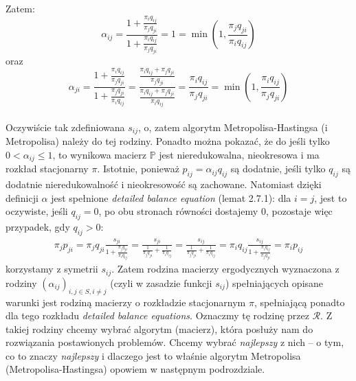 \documentclass[a4paper]{article}
\begin{document}
Zatem:
$$\alpha_{ij} = \frac{1 + \frac{\pi_i q_{ij}}{\pi_j q_{ji}}}{1 + \frac{\pi_i q_{ij}}{\pi_j q_{ji}}} = 1 = \min(1, \frac{\pi_j q_{ji}}{\pi_i q_{ij}})$$
oraz
$$\alpha_{ji} = \frac{1 + \frac{\pi_i q_{ij}}{\pi_j q_{ji}}}{1 + \frac{\pi_j q_{ji}}{\pi_i q_{ij}}} = \frac{\frac{\pi_i q_{ij} + \pi_j q_{ji}}{\pi_j q_{ji}}}{\frac{\pi_i q_{ij} + \pi_j q_{ji}}{\pi_i q_{ij}}} = \frac{\pi_i q_{ij}}{\pi_j q_{ji}} = \min(1, \frac{\pi_i q_{ij}}{\pi_j q_{ji}}) $$
\\
Oczywiście tak zdefiniowana $s_{ij}$, o, zatem algorytm Metropolisa-Hastingsa (i Metropolisa) należy do tej rodziny. Ponadto można pokazać, że do jeśli tylko $0 < \alpha_{ij} \leq 1$, to wynikowa macierz $\mathbb{P}$ jest nieredukowalna, nieokresowa i ma rozkład stacjonarny $\pi$. Istotnie, ponieważ $p_{ij} = \alpha_{ij}q_{ij}$ są dodatnie, jeśli tylko $q_{ij}$ są dodatnie nieredukowalność i nieokresowość są zachowane. Natomiast dzięki definicji $\alpha$ jest spełnione \textit{detailed balance equation} (lemat 2.7.1): dla $i = j$, jest to oczywiste, jeśli $q_{ij} = 0$, po obu stronach równości dostajemy $0$, pozostaje więc przypadek, gdy $q_{ij} > 0$:
\begin{align*}
\pi_j p_{ji} = \pi_j q_{ji} \frac{s_{ji}}{1 + \frac{\pi_j q_{ji}}{\pi_i q_{ij}}} = \frac{s_{ji}}{\frac{1}{\pi_j q_{ji}} + \frac{1}{\pi_i q_{ij}}} = \frac{s_{ij}}{\frac{1}{\pi_j q_{ji}} + \frac{1}{\pi_i q_{ij}}} = \pi_i q_{ij} \frac{s_{ij}}{1 + \frac{\pi_i q_{ij}}{\pi_j q_{ji}}} = \pi_i p_{ij}
\end{align*}
korzystamy z symetrii $s_{ij}$. Zatem rodzina macierzy ergodycznych wyznaczona z rodziny $(\alpha_{ij})_{i,j \in S, i \neq j}$ (czyli w zasadzie funkcji $s_{ij}$) spełniających opisane warunki jest rodziną macierzy o rozkładzie stacjonarnym $\pi$, spełniającą ponadto dla tego rozkładu \textit{detailed balance equations}. Oznaczmy tę rodzinę przez $\mathcal{R}$.
Z takiej rodziny chcemy wybrać algorytm (macierz), która posłuży nam do rozwiązania postawionych problemów. Chcemy wybrać \textit{najlepszy} z nich – o tym, co to znaczy \textit{najlepszy} i dlaczego jest to właśnie algorytm Metropolisa (Metropolisa-Hastingsa) opowiem w następnym podrozdziale.
\end{document}
